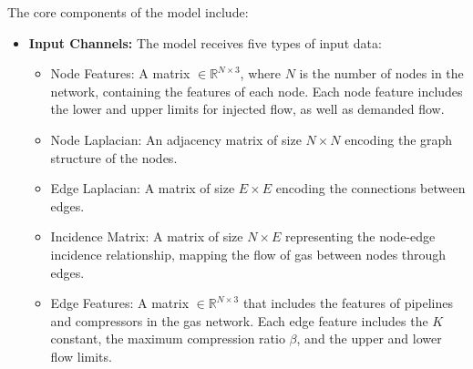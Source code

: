 The core components of the model include:

\begin{itemize}
    \item \textbf{Input Channels:} The model receives five types of input data:
        
        
    \begin{itemize}
        \item Node Features: A matrix $\in \mathbb{R}^{N \times 3}$, where $N$ is the number of nodes in the network, containing the features of each node. Each node feature includes the lower and upper limits for injected flow, as well as demanded flow.
        \item Node Laplacian: An adjacency matrix of size $N\times N$ encoding the graph structure of the nodes.
        \item Edge Laplacian: A matrix of size $E\times E$ encoding the connections between edges.
        \item Incidence Matrix: A matrix of size $N\times E$ representing the node-edge incidence relationship, mapping the flow of gas between nodes through edges.
        \item Edge Features: A matrix $\in \mathbb{R}^{N \times 3}$ that includes the features of pipelines and compressors in the gas network. Each edge feature includes the $K$ constant, the maximum compression ratio $\beta$, and the upper and lower flow limits.
    \end{itemize}


\end{itemize}
